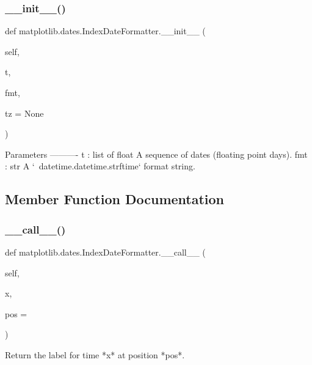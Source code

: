\subsubsection{\texorpdfstring{\+\_\+\+\_\+init\+\_\+\+\_\+()}{\_\_init\_\_()}}
{\footnotesize\ttfamily def matplotlib.\+dates.\+Index\+Date\+Formatter.\+\_\+\+\_\+init\+\_\+\+\_\+ (\begin{DoxyParamCaption}\item[{}]{self,  }\item[{}]{t,  }\item[{}]{fmt,  }\item[{}]{tz = {\ttfamily None} }\end{DoxyParamCaption})}

\begin{DoxyVerb}Parameters
----------
t : list of float
    A sequence of dates (floating point days).
fmt : str
    A `~datetime.datetime.strftime` format string.
\end{DoxyVerb}
 

\subsection{Member Function Documentation}
\mbox{\label{classmatplotlib_1_1dates_1_1IndexDateFormatter_a8d183d30e6206f6c8e80c2145630ef93}} 
\subsubsection{\texorpdfstring{\+\_\+\+\_\+call\+\_\+\+\_\+()}{\_\_call\_\_()}}
{\footnotesize\ttfamily def matplotlib.\+dates.\+Index\+Date\+Formatter.\+\_\+\+\_\+call\+\_\+\+\_\+ (\begin{DoxyParamCaption}\item[{}]{self,  }\item[{}]{x,  }\item[{}]{pos = {} }\end{DoxyParamCaption})}

\begin{DoxyVerb}Return the label for time *x* at position *pos*.\end{DoxyVerb}
 

